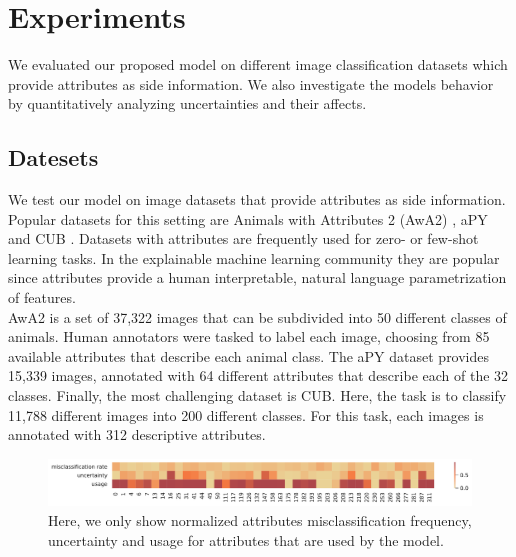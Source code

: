 \documentclass[a4paper,cleardoubleempty,BCOR1cm, 11pt]{report}
\begin{document}

\chapter{Experiments}
We evaluated our proposed model on different image classification datasets which provide attributes as side information. We also investigate the models behavior by quantitatively analyzing uncertainties and their affects.


\section{Datesets}
We test our model on image datasets that provide attributes as side information. Popular datasets for this setting are Animals with Attributes 2 (AwA2) \cite{8413121}, aPY \cite{farhadi2009describing} and CUB \cite{WahCUB_200_2011}. Datasets with attributes are frequently used for zero- or few-shot learning tasks. In the explainable machine learning community they are popular since attributes provide a human interpretable, natural language parametrization of features.\\
AwA2 is a set of 37,322 images that can be subdivided into 50 different classes of animals. Human annotators were tasked to label each image, choosing from 85 available attributes that describe each animal class. The aPY dataset provides 15,339 images, annotated with 64 different attributes that describe each of the 32 classes. Finally, the most challenging dataset is CUB. Here, the task is to classify 11,788 different images into 200 different classes. For this task, each images is annotated with 312 descriptive attributes.

\begin{figure}[t!]
	\centering
	\includegraphics[width=1\textwidth]{images/attr_heatmap_short.pdf} 
	\caption{Here, we only show normalized attributes misclassification frequency, uncertainty and usage for attributes that are used by the model.}
	\label{fig:less_attrs}
\end{figure}
\end{document}
